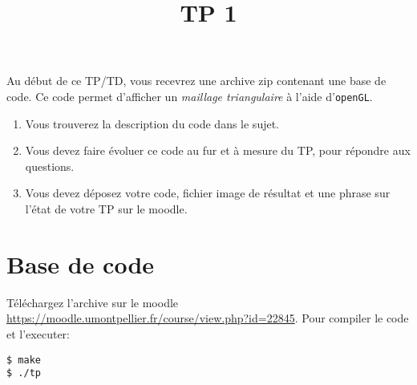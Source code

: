 \documentclass[a4paper,10pt]{tp_um}
\title{\Large \sffamily\bfseries TP 1}
\newcommand\code[1]{\texttt{#1}}
\begin{document}
\maketitle

\bigskip
\bigskip
\bigskip

Au d\'ebut de ce TP/TD, vous recevrez une archive zip contenant une base de code.
Ce code permet d'afficher un \emph{maillage triangulaire} \`a l'aide d'\texttt{openGL}.
\begin{enumerate}
 \item Vous trouverez la description du code dans le sujet.
 \item Vous devez faire \'evoluer ce code au fur et \`a mesure du TP, pour r\'epondre aux questions.
 \item Vous devez déposez votre code, fichier image de résultat et une phrase sur l'état de votre TP sur le moodle.
\end{enumerate}


\section{Base de code}

T\'el\'echargez l'archive sur le moodle \url{https://moodle.umontpellier.fr/course/view.php?id=22845}. Pour compiler le code et l'executer: 
\begin{verbatim}
$ make
$ ./tp
\end{verbatim}

% 
% 
% 
% 
% 
\end{document}
